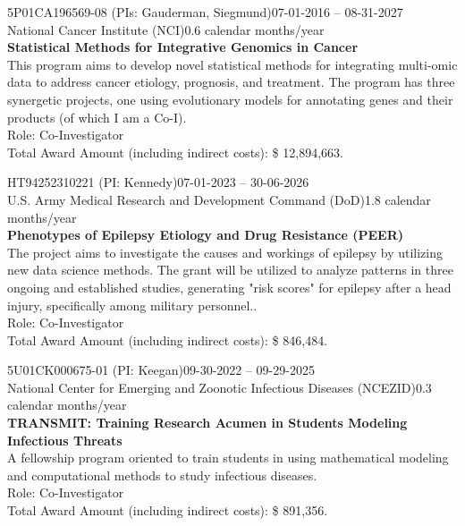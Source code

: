 \documentclass[letterpaper, 10pt]{article}
\renewcommand{\textbf}[1]{{\bfseries\color{teal}#1}}
\begin{document}
\noindent 5P01CA196569-08 (PIs: Gauderman, Siegmund)\hfill 07-01-2016 -- 08-31-2027\\
National Cancer Institute (NCI)\hfill 0.6 calendar months/year\\
\textbf{Statistical Methods for Integrative Genomics in Cancer}\\
This program aims to develop novel statistical methods for integrating multi-omic data to address cancer etiology, prognosis, and treatment. The program has three synergetic projects, one using evolutionary models for annotating genes and their products (of which I am a Co-I). \\
Role: Co-Investigator\\
Total Award Amount (including indirect costs): \$ 12,894,663. \vspace{.5cm}

\noindent HT94252310221 (PI: Kennedy)\hfill 07-01-2023 -- 30-06-2026\\
U.S. Army Medical Research and Development Command (DoD)\hfill 1.8 calendar months/year\\
\textbf{Phenotypes of Epilepsy Etiology and Drug Resistance (PEER)}\\
The project aims to investigate the causes and workings of epilepsy by utilizing new data science methods. The grant will be utilized to analyze patterns in three ongoing and established studies, generating "risk scores" for epilepsy after a head injury, specifically among military personnel..\\
Role: Co-Investigator\\
Total Award Amount (including indirect costs): \$ 846,484. \vspace{.5cm}

\noindent 5U01CK000675-01 (PI: Keegan)\hfill 09-30-2022 -- 09-29-2025\\
National Center for Emerging and Zoonotic Infectious Diseases (NCEZID)\hfill 0.3 calendar months/year\\
\textbf{TRANSMIT: Training Research Acumen in Students Modeling Infectious Threats}\\
A fellowship program oriented to train students in using mathematical modeling and computational methods to study infectious diseases.\\
Role: Co-Investigator\\
Total Award Amount (including indirect costs): \$ 891,356. \vspace{.5cm}

% 
% 
\end{document}
